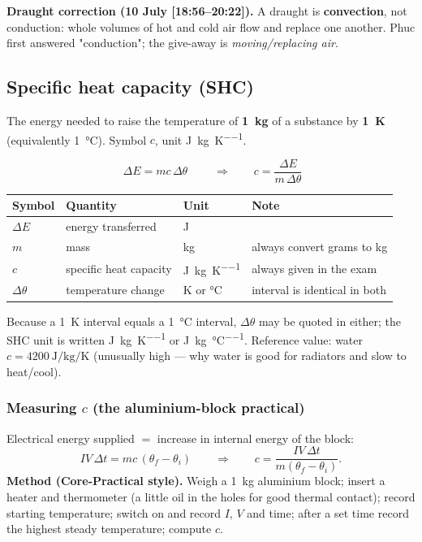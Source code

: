 \documentclass[11pt,a4paper]{article}
\newcommand{\ts}[1]{\textup{[#1]}}       %
\newcommand{\dtheta}{\Delta\theta}
\newcommand{\dE}{\Delta E}
\begin{document}
\begin{watchbox}
\textbf{Draught correction (10 July \ts{18:56--20:22}).} A draught is \textbf{convection},
not conduction: whole volumes of hot and cold air flow and replace one another. Phuc first
answered "conduction"; the give-away is \emph{moving/replacing air}.
\end{watchbox}

\subsection{Specific heat capacity (SHC)}

\begin{defbox}
The energy needed to raise the temperature of \textbf{\SI{1}{\kilogram}} of a substance by
\textbf{\SI{1}{\kelvin}} (equivalently \SI{1}{\celsius}). Symbol $c$, unit
\si{\joule\per\kilogram\per\kelvin}.
\end{defbox}

\[
\boxed{\;\dE = mc\,\dtheta\;}
\qquad\Longrightarrow\qquad
c = \frac{\dE}{m\,\dtheta}
\]

\begin{center}
\renewcommand{\arraystretch}{1.3}
\begin{tabular}{@{}llll@{}}
\toprule
\textbf{Symbol} & \textbf{Quantity} & \textbf{Unit} & \textbf{Note} \\
\midrule
$\dE$ & energy transferred & \si{\joule} & \\
$m$ & mass & \si{\kilogram} & always convert grams to kg \\
$c$ & specific heat capacity & \si{\joule\per\kilogram\per\kelvin} & always given in the exam \\
$\dtheta$ & temperature change & \si{\kelvin} or \si{\celsius} & interval is identical in both \\
\bottomrule
\end{tabular}
\end{center}

Because a \SI{1}{\kelvin} interval equals a \SI{1}{\celsius} interval, $\dtheta$ may be
quoted in either; the SHC unit is written \si{\joule\per\kilogram\per\kelvin} or
\si{\joule\per\kilogram\per\celsius}. Reference value: water $c = \SI{4200}{\joule\per\kilogram\per\kelvin}$
(unusually high --- why water is good for radiators and slow to heat/cool).

\subsubsection{Measuring $c$ (the aluminium-block practical)}
Electrical energy supplied $=$ increase in internal energy of the block:
\[
IV\,\Delta t = mc\,(\theta_f - \theta_i)
\qquad\Longrightarrow\qquad
c = \frac{IV\,\Delta t}{m(\theta_f-\theta_i)} .
\]
\textbf{Method (Core-Practical style).} Weigh a \SI{1}{\kilogram} aluminium block; insert a
heater and thermometer (a little oil in the holes for good thermal contact); record
starting temperature; switch on and record $I$, $V$ and time; after a set time record the
highest steady temperature; compute $c$.
\end{document}
